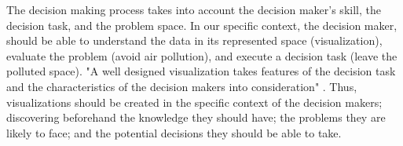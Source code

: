 The decision making process takes into account the decision maker's skill, the decision task, and the problem space. In our specific context, the decision maker, should be able to understand the data in its represented space (visualization), evaluate the problem (avoid air pollution), and execute a decision task (leave the polluted space). "A well designed visualization takes features of the decision task and the characteristics of the decision makers into consideration" \cite{Zhu2008}. Thus, visualizations should be created in the specific context of the decision makers; discovering beforehand the knowledge they should have; the problems they are likely to face; and the potential decisions they should be able to take. 